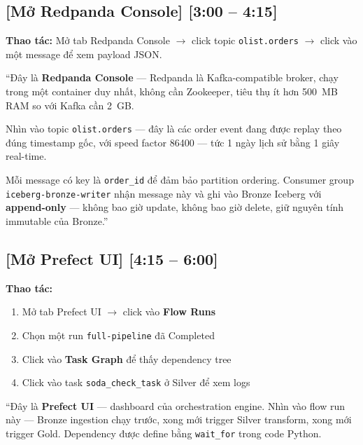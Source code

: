 \documentclass[12pt, a4paper]{article}
\newenvironment{speakerbox}[2]{%
  \begin{tcolorbox}[
    enhanced, breakable,
    colback=#1!6!white,
    colframe=#1,
    colbacktitle=#1,
    coltitle=white,
    fonttitle=\bfseries\large,
    title={#2},
    arc=4pt,
    boxrule=1.5pt,
    left=8pt, right=8pt, top=6pt, bottom=6pt,
  ]
}{%
  \end{tcolorbox}
}
\newcommand{\timing}[1]{%
  \hfill{\small\bfseries\color{gray}[#1]}%
}
\begin{document}
\begin{speakerbox}{p2color}{\faUser\ Người 2 · 3:00 -- 6:00}

\subsection*{[Mở Redpanda Console] \timing{3:00 -- 4:15}}

\begin{demobox}
\textbf{Thao tác:} Mở tab Redpanda Console $\to$ click topic \texttt{olist.orders}
$\to$ click vào một message để xem payload JSON.
\end{demobox}

\begin{scriptbox}
``Đây là \textbf{Redpanda Console} --- Redpanda là Kafka-compatible broker, chạy trong
một container duy nhất, không cần Zookeeper, tiêu thụ ít hơn 500~MB RAM so với
Kafka cần 2~GB.

Nhìn vào topic \texttt{olist.orders} --- đây là các order event đang được replay
theo đúng timestamp gốc, với speed factor 86400 --- tức 1 ngày lịch sử bằng 1 giây
real-time.

Mỗi message có key là \texttt{order\_id} để đảm bảo partition ordering. Consumer group
\texttt{iceberg-bronze-writer} nhận message này và ghi vào Bronze Iceberg với
\textbf{append-only} --- không bao giờ update, không bao giờ delete, giữ nguyên tính
immutable của Bronze.''
\end{scriptbox}

\subsection*{[Mở Prefect UI] \timing{4:15 -- 6:00}}

\begin{demobox}
\textbf{Thao tác:}
\begin{enumerate}[leftmargin=1.5em, itemsep=2pt]
  \item Mở tab Prefect UI $\to$ click vào \textbf{Flow Runs}
  \item Chọn một run \texttt{full-pipeline} đã \textcolor{green!60}{Completed}
  \item Click vào \textbf{Task Graph} để thấy dependency tree
  \item Click vào task \texttt{soda\_check\_task} ở Silver để xem logs
\end{enumerate}
\end{demobox}

\begin{scriptbox}
``Đây là \textbf{Prefect UI} --- dashboard của orchestration engine. Nhìn vào flow run này
--- Bronze ingestion chạy trước, xong mới trigger Silver transform, xong mới trigger
Gold. Dependency được define bằng \texttt{wait\_for} trong code Python.


\end{scriptbox}
\end{speakerbox}
\end{document}
